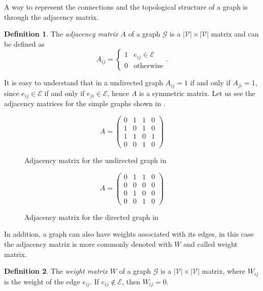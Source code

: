 \documentclass[12pt,a4paper]{report}
\theoremstyle{definition}
\newtheorem{definition}{Definition}[chapter]
\begin{document}
A way to represent the connections and the topological structure of a graph is through the adjacency matrix.
\begin{definition}
The \emph{adjacency matrix $A$} of a graph $\mathcal{G}$ is a $|\mathcal{V}| \times |\mathcal{V}|$ matrix and can be defined as
\begin{equation*}
    A_{ij} = 
    \begin{cases}
    1 & e_{ij} \in \mathcal{E} \\
    0 & \text{otherwise}
    \end{cases}.
\end{equation*}
\end{definition}
It is easy to understand that in a undirected graph $A_{ij}=1$ if and only if $A_{ji}=1$, since $e_{ij} \in \mathcal{E}$ if and only if $e_{ji} \in \mathcal{E}$, hence $A$ is a symmetric matrix.
Let us see the adjacency matrices for the simple graphs shown in .
\begin{figure}[h]
\begin{minipage}[b]{0.45\linewidth}
\centering
    \begin{equation*}
    A = 
    \begin{pmatrix}
    0 & 1 & 1 & 0 \\
    1 & 0 & 1 & 0 \\
    1 & 1 & 0 & 1 \\
    0 & 0 & 1 & 0 
    \end{pmatrix}
    \end{equation*}
\caption{Adjacency matrix for the undirected graph in }
\label{fig:A_undirected}
\end{minipage}
\hspace{0.5cm}
\begin{minipage}[b]{0.45\linewidth}
\centering
    \begin{equation*}
    A = 
    \begin{pmatrix}
    0 & 1 & 1 & 0 \\
    0 & 0 & 0 & 0 \\
    0 & 1 & 0 & 0 \\
    0 & 0 & 1 & 0 
    \end{pmatrix}
    \end{equation*}
\caption{Adjacency matrix for the directed graph in }
\label{fig:A_directed}
\end{minipage}
\end{figure}

In addition, a graph can also have weights associated with its edges, in this case the adjacency matrix is more commonly denoted with $W$ and called weight matrix.
\begin{definition}
The \emph{weight matrix $W$} of a graph $\mathcal{G}$ is a $|\mathcal{V}| \times |\mathcal{V}|$ matrix, where $W_{ij}$ is the weight of the edge $e_{ij}$. If $e_{ij} \notin \mathcal{E}$, then $W_{ij} = 0$.
\end{definition}
\end{document}
